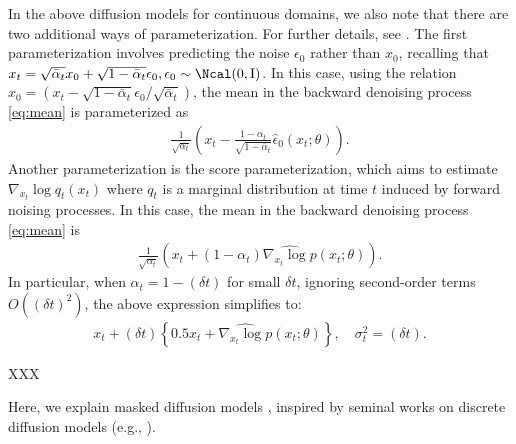 \documentclass[12pt]{article} %
\begin{document}
{\begin{remark}
In the above diffusion models for continuous domains, we also note that there are two additional ways of parameterization. For further details, see \citet{luo2022understanding}. The first parameterization involves predicting the noise $\epsilon_0$ rather than $x_0$, recalling that
$x_t = \sqrt{\bar \alpha_t}x_0 +\sqrt{1-\bar \alpha_t}\epsilon_0, \epsilon_0 \sim \Ncal(0,\rI)$. In this case, using the relation $x_0 =(x_t -\sqrt{1-\bar \alpha_t} \epsilon_0/\sqrt{\bar \alpha_t})$, the mean in the backward denoising process \eqref{eq:mean} is parameterized as 
\begin{align*}
    \frac{1}{\sqrt{\alpha_t}}\left(x_t - \frac{1-\alpha_t}{\sqrt{1-\bar \alpha_t}} \hat \epsilon_0(x_t;\theta)  \right). 
\end{align*}
Another parameterization is the score parameterization, which aims to estimate $\nabla_{x_t} \log q_t(x_t)$ where $q_t$ is a marginal distribution at time $t$ induced by forward noising processes. In this case, the mean in the backward denoising process \eqref{eq:mean} is 
\begin{align*}
      \frac{1}{\sqrt{\alpha_t}}\left(x_t + (1-\alpha_t)\widehat {\nabla_{x_t} \log p}(x_t;\theta)  \right). 
\end{align*}
In particular, when $\alpha_t=1-(\delta t)$ for small $\delta t$, ignoring second-order terms $O((\delta t)^2)$, the above expression simplifies to:
\begin{align}\label{eq:score_rep}
     x_t + (\delta t)\left \{0.5 x_t  + \widehat{\nabla_{x_t} \log p}(x_t;\theta) \right \},\quad \sigma^2_t=(\delta t). 
\end{align}
\end{remark}

\begin{Exabox}{XXX}
\begin{example}\label{exa:discrete}


Here, we explain masked diffusion models \citep{sahoo2024simple, shi2024simplified}, inspired by seminal works on discrete diffusion models (e.g., \citet{ austin2021structured,campbell2022continuous,lou2023discrete}).


\end{example}
\end{Exabox}}
\end{document}
